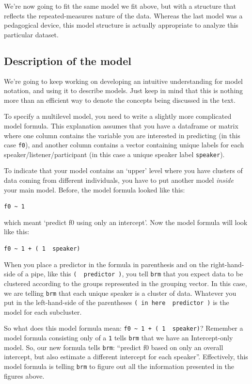 \documentclass[
]{book}
\begin{document}
We're now going to fit the same model we fit above, but with a structure that reflects the repeated-measures nature of the data. Whereas the last model was a pedagogical device, this model structure is actually appropriate to analyze this particular dataset.

\hypertarget{description-of-the-model-1}{%
\subsection{Description of the model}\label{description-of-the-model-1}}

We're going to keep working on developing an intuitive understanding for model notation, and using it to describe models. Just keep in mind that this is nothing more than an efficient way to denote the concepts being discussed in the text.

To specify a multilevel model, you need to write a slightly more complicated model formula. This explanation assumes that you have a dataframe or matrix where one column contains the variable you are interested in predicting (in this case \texttt{f0}), and another column contains a vector containing unique labels for each speaker/listener/participant (in this case a unique speaker label \texttt{speaker}).

To indicate that your model contains an `upper' level where you have clusters of data coming from different individuals, you have to put another model \emph{inside} your main model. Before, the model formula looked like this:

\texttt{f0\ \textasciitilde{}\ 1}

which meant `predict f0 using only an intercept'. Now the model formula will look like this:

\texttt{f0\ \textasciitilde{}\ 1\ +\ (\ 1\ \textbar{}\ speaker)}

When you place a predictor in the formula in parenthesis and on the right-hand-side of a pipe, like this \texttt{(\ \textbar{}\ predictor\ )}, you tell \texttt{brm} that you expect data to be clustered according to the groups represented in the grouping vector. In this case, we are telling \texttt{brm} that each unique speaker is a cluster of data. Whatever you put in the left-hand-side of the parentheses \texttt{(\ in\ here\ \textbar{}\ predictor\ )} is the model for each subcluster.

So what does this model formula mean: \texttt{f0\ \textasciitilde{}\ 1\ +\ (\ 1\ \textbar{}\ speaker)}? Remember a model formula consisting only of a \texttt{1} tells \texttt{brm} that we have an Intercept-only model. So, our new formula tells \texttt{brm}: ``predict f0 based on only an overall intercept, but also estimate a different intercept for each speaker''. Effectively, this model formula is telling \texttt{brm} to figure out all the information presented in the figures above.
\end{document}
